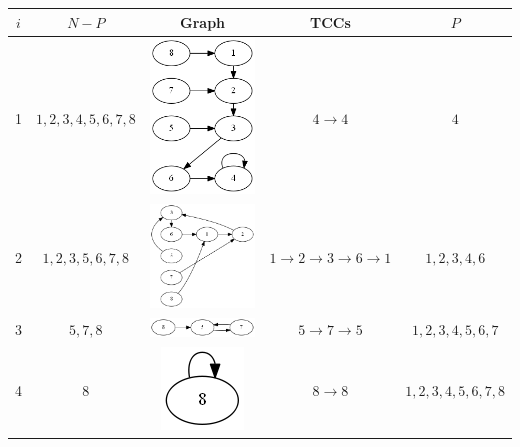 \documentclass{article}
\begin{document}
\begin{enumerate}
\begin{enumerate}
  \begin{tabular}{| c | c | c | c | c |}
  \hline
  $i$ & $N - P$ & Graph & TCCs & $P$ \\
  \hline\hline
  1   & $1, 2, 3, 4, 5, 6, 7, 8$ & \includegraphics[scale=0.3]{step-1}
            & $4 \rightarrow 4$ & $4$ \\
  \hline
  2   & $1, 2, 3, 5, 6, 7, 8$ & \includegraphics[scale=0.3]{step-2}
            & $1 \rightarrow 2 \rightarrow 3 \rightarrow 6 \rightarrow 1$ & $1, 2, 3, 4, 6$ \\
  \hline
  3   & $5, 7, 8$ & \includegraphics[scale=0.3]{step-3}
            & $5 \rightarrow 7 \rightarrow 5$ & $1, 2, 3, 4, 5, 6, 7$ \\
  \hline
  4   & $8$ & \includegraphics[scale=0.3]{step-4}
            & $8 \rightarrow 8$ & $1, 2, 3, 4, 5, 6, 7, 8$ \\
  \hline
  \end{tabular} \\


\end{enumerate}
\end{enumerate}
\end{document}
